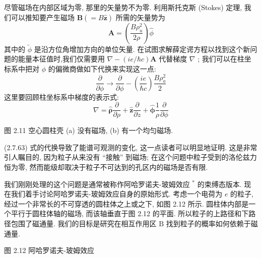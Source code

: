 尽管磁场在内部区域为零, 那里的矢量势不为零. 利用斯托克斯 (Stokes) 定理, 我们可以推知要产生磁场 $\mathbf{B}\left( { = B\widehat{\mathbf{z}}}\right)$ 所需的矢量势为
\begin{equation}
\mathbf{A} = \left( \frac{B{\rho }_{u}^{2}}{2\rho }\right) \widehat{\phi }
\end{equation}
其中的 $\widetilde{\phi }$ 是沿方位角增加方向的单位矢量. 在试图求解薛定谔方程以找到这个新问题的能量本征值时,我们仅需要用 $\nabla - \left( {{ie}/\hbar c}\right) \mathbf{A}$ 代替梯度 $\nabla$ ; 我们可以在柱坐标系中把对 $\phi$ 的偏微商做如下代换来实现这一点:
\begin{equation}
\frac{\partial }{\partial \phi } \rightarrow \frac{\partial }{\partial \phi } - \left( \frac{ie}{\hbar c}\right) \frac{B{\rho }_{a}^{2}}{2}
\end{equation}
这里要回顾柱坐标系中梯度的表示式:
\begin{equation}
\nabla = \widehat{\mathbf{\rho }}\frac{\partial }{\partial \rho } + \widehat{\mathbf{z}}\frac{\partial }{\partial z} + \widehat{\mathbf{\phi }}\frac{1}{\rho }\frac{\partial }{\partial \phi }
\end{equation}

图 2.11 空心圆柱壳 (a) 没有磁场, (b) 有一个均匀磁场.

(2.7.63) 式的代换导致了能谱可观测的变化, 这一点读者可以明显地证明. 这是非常引人瞩目的, 因为粒子从来没有 “接触” 到磁场; 在这个问题中粒子受到的洛伦兹力恒为零, 然而能级却取决于粒子不可达到的孔区内的磁场是否有限.

我们刚刚处理的这个问题是通常被称作阿哈罗诺夫-玻姆效应 ${}^{ * }$ 的束缚态版本. 现在我们着手讨论阿哈罗诺夫-玻姆效应自身的原始形式. 考虑一个电荷为 $e$ 的粒子,经过一个非常长的不可穿透的圆柱体之上或之下, 如图 2.12 所示. 圆柱体内部是一个平行于圆柱体轴的磁场, 而该轴垂直于图 2.12 的平面. 所以粒子的上路径和下路径包围了磁通量. 我们的目标是研究在相互作用区 $\mathrm{B}$ 找到粒子的概率如何依赖于磁通量.

图 2.12 阿哈罗诺夫-玻姆效应

